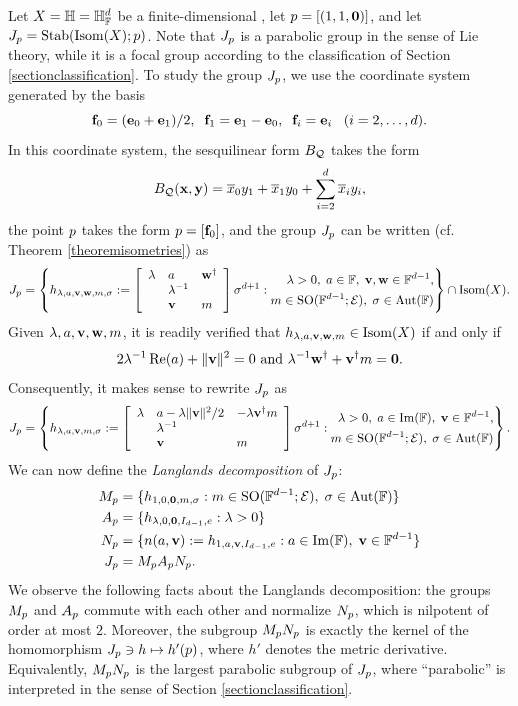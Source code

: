 {Let $X = \H = \H_\F^d$ be a finite-dimensional \CROSS, let $p = [(1,1,\mathbf 0)]$, and let $J_p = \operatorname{Stab}(\operatorname{Isom}(X);p)$. Note that $J_p$ is a parabolic group in the sense of Lie theory, while it is a focal group according to the classification of Section \ref{sectionclassification}. To study the group $J_p$, we use the coordinate system generated by the basis
\[
\mathbf f_0 = (\mathbf e_0 + \mathbf e_1)/2, \;\; \mathbf f_1 = \mathbf e_1 - \mathbf e_0, \;\; \mathbf f_i = \mathbf e_i \;\;\; (i = 2,\ldots,d).
\]
In this coordinate system, the sesquilinear form $B_\mathcal Q$ takes the form
\[
B_\mathcal Q(\mathbf x,\mathbf y) = \overline x_0 y_1 + \overline x_1 y_0 + \sum_{i = 2}^d \overline x_i y_i,
\]
the point $p$ takes the form $p = [\mathbf f_0]$, and the group $J_p$ can be written (cf. Theorem \ref{theoremisometries}) as
\[
J_\bp = \left\{ h_{\lambda,a,\vv,\ww,m,\sigma} := \left[\begin{array}{lll}
\lambda & a & \ww^\dag\\
& \lambda^{-1} &\\
& \vv & m
\end{array}\right] \sigma^{d + 1} :
\begin{split}
\lambda > 0,\; a\in \F,\;  \vv,\ww\in \F^{d - 1},\\
m\in \SO(\F^{d - 1};\EE),\; \sigma\in\Aut(\F)
\end{split}\right\} \cap \Isom(X).
\]
Given $\lambda,a,\mathbf v,\mathbf w,m$, it is readily verified that $h_{\lambda,a,\mathbf v,\mathbf w,m}\in \operatorname{Isom}(X)$ if and only if
\[
2\lambda^{-1}\operatorname{Re}(a) + \|\mathbf v\|^2 = 0 \textup{ and } \lambda^{-1}\mathbf w^\dag + \mathbf v^\dag m = \mathbf 0.
\]
Consequently, it makes sense to rewrite $J_p$ as
\[
J_\bp = \left\{ h_{\lambda,a,\vv,m,\sigma} := \left[\begin{array}{lll}
\lambda & a - \lambda\|\vv\|^2/2 & -\lambda\vv^\dag m\\
& \lambda^{-1} &\\
& \vv & m
\end{array}\right] \sigma^{d + 1} :
\begin{split}
\lambda > 0,\; a\in \Im(\F),\;  \vv\in \F^{d - 1},\\
m\in \SO(\F^{d - 1};\EE),\; \sigma\in\Aut(\F)
\end{split}\right\}.
\]
We can now define the \emph{Langlands decomposition} of $J_p$:
\begin{align*}
M_\bp &= \{h_{1,0,\0,m,\sigma} : m\in\SO(\F^{d - 1};\EE),\; \sigma\in \Aut(\F)\}\\
A_\bp &= \{h_{\lambda,0,\0,I_{d - 1},e} : \lambda > 0\}\\
N_\bp &= \{n(a,\vv) := h_{1,a,\vv,I_{d - 1},e} : a\in\Im(\F) ,\; \vv\in \F^{d - 1}\}\\
J_\bp &= M_\bp A_\bp N_\bp.
\end{align*}
We observe the following facts about the Langlands decomposition: the groups $M_p$ and $A_p$ commute with each other and normalize $N_p$, which is nilpotent of order at most $2$. Moreover, the subgroup $M_p N_p$ is exactly the kernel of the homomorphism $J_p\ni h\mapsto h'(p)$, where $h'$ denotes the metric derivative. Equivalently, $M_p N_p$ is the largest parabolic subgroup of $J_p$, where ``parabolic'' is interpreted in the sense of Section \ref{sectionclassification}.

}
